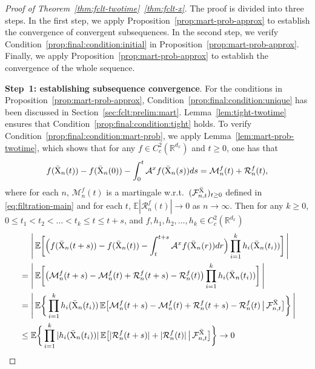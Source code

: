 \documentclass[11pt]{article}
\theoremstyle{plain}
\theoremstyle{definition}
\def\MM{{\mathcal M}}
\def\AM{{\mathcal A}}
\def\FM{{\mathcal F}}
\def\RM{{\mathcal R}}
\def\RB{{\mathbb R}}
\def\EB{{\mathbb E}}
\newcommand{\xbar}{{\bar{\textnormal{X}}}}
\begin{document}
\begin{appendix}
\begin{proof}[Proof of Theorem~\ref{thm:fclt-twotime}~\ref{thm:fclt-x}]
    The proof is divided into three steps.
    In the first step, we apply Proposition~\ref{prop:mart-prob-approx} to establish the convergence of convergent subsequences.
    In the second step, we verify Condition~\ref{prop:final:condition:initial} in Proposition~\ref{prop:mart-prob-approx}.
    Finally, we apply Proposition~\ref{prop:mart-prob-approx} to establish the convergence of the whole sequence.
    \vspace{0.2cm}
    
    \textbf{Step~1: establishing subsequence convergence}.
    For the conditions in Proposition~\ref{prop:mart-prob-approx},
    Condition~\ref{prop:final:condition:unique} has been discussed in Section~\ref{sec:fclt:prelim:mart}.
    Lemma~\ref{lem:tight-twotime} ensures that Condition~\ref{prop:final:condition:tight} holds.
    To verify Condition~\ref{prop:final:condition:mart-prob}, we apply Lemma~\ref{lem:mart-prob-twotime}, which shows that
    for any $f \in C^2_c(\RB^{d_x})$ and $t \ge 0$, one has that
    \begin{align*}
        f(\xbar_{n}(t)) - f(\xbar_{n}(0)) - \int_0^{t} \AM^x f(\xbar_{n}(s)) ds
        = \MM_{n}^f(t) + \RM_{n}^f(t), 
    \end{align*}
    where for each $n$, $\MM_{n}^f(t)$ is a martingale w.r.t.\ $(\FM^\xbar_{n,t})_{t \ge 0}$ defined in \eqref{eq:filtration-main} and for each $t$, $\EB | \RM_{n}^f(t) | \to 0$ as $n \to \infty$. 
    Then for any $k \ge 0$, $0 \le t_1 < t_2 < \dots < t_k \le t \le t+s $, and $f, h_1, h_2, \dots, h_k \in C_c^2(\RB^{d_x})$
    \begin{align*}
        & \quad \ \Bigg|\, \EB  \bigg[ \Big( f(\xbar_{n}(t+s)) - f(\xbar_{n}(t)) - \int_t^{t+s} \AM^x f(\xbar_{n}(r)) dr \Big) \prod_{i=1}^k h_i(\xbar_{n}(t_i)) \bigg]\, \Bigg| \\
        & = \Bigg|\, \EB \bigg[ \big(\MM_{n}^f(t+s) - \MM_{n}^f(t) + \RM_{n}^f(t+s) - \RM_{n}^f(t) \big) \prod_{i=1}^k h_i(\xbar_{n}(t_i)) \bigg] \, \Bigg| \\
        & = \Bigg|\, \EB \bigg\{ \prod_{i=1}^k h_i(\xbar_{n}(t_i))\, \EB \big[ \MM_{n}^f(t+s) - \MM_{n}^f(t) + \RM_{n}^f(t+s) - \RM_{n}^f(t) \,\big|\, \FM_{n,t}^\xbar \big]  \bigg\} \, \Bigg| \\
        & \le  \EB \bigg\{ \prod_{i=1}^k | h_i(\xbar_{n}(t_i)) | \, \EB \big[ | \RM_{n}^f(t+s) | + | \RM_{n}^f(t) | \,\big|\, \FM_{n,t}^\xbar \big]  \bigg\} \to 0

\end{align*}
\end{proof}
\end{appendix}
\end{document}
